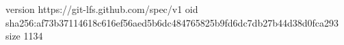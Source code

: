 version https://git-lfs.github.com/spec/v1
oid sha256:af73b37114618c616ef56aed5b6dc484765825b9fd6dc7db27b44d38d0fca293
size 1134
